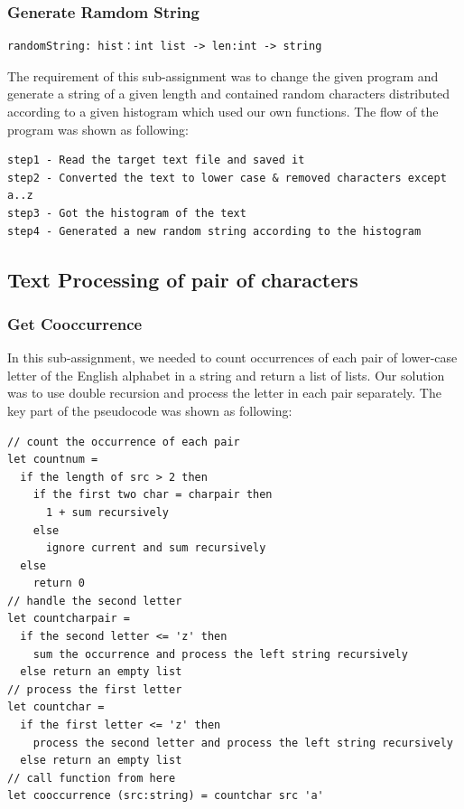 \documentclass{article}
\begin{document}
\subsubsection{Generate Ramdom String}
\begin{lstlisting}
randomString: hist：int list -> len:int -> string
\end{lstlisting}

The requirement of this sub-assignment was to change the given program and generate a string of a given length and contained random characters distributed according to a given histogram which used our own functions. The flow of the program was shown as following:

\begin{lstlisting}
step1 - Read the target text file and saved it
step2 - Converted the text to lower case & removed characters except a..z
step3 - Got the histogram of the text
step4 - Generated a new random string according to the histogram
\end{lstlisting}

\subsection{Text Processing of pair of characters}

\subsubsection{Get Cooccurrence}

In this sub-assignment, we needed to count occurrences of each pair of lower-case letter of the English alphabet in a string and return a list of lists. Our solution was to use double recursion and process the letter in each pair separately. The key part of the pseudocode was shown as following:

\begin{lstlisting}
// count the occurrence of each pair
let countnum = 
  if the length of src > 2 then
    if the first two char = charpair then
      1 + sum recursively
    else
      ignore current and sum recursively
  else
    return 0      
// handle the second letter    
let countcharpair = 
  if the second letter <= 'z' then
    sum the occurrence and process the left string recursively
  else return an empty list   
// process the first letter
let countchar = 
  if the first letter <= 'z' then
    process the second letter and process the left string recursively
  else return an empty list    
// call function from here
let cooccurrence (src:string) = countchar src 'a'
\end{lstlisting}
\end{document}

